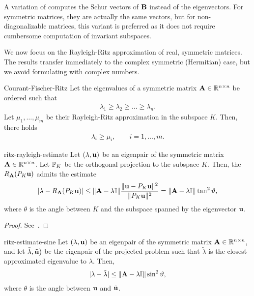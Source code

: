 \begin{remark}
  A variation of  computes the
  Schur vectors of $\matb$ instead of the eigenvectors. For symmetric
  matrices, they are actually the same vectors, but for
  non-diagonalizable matrices, this variant is preferred as it does
  not require cumbersome computation of invariant subspaces.
\end{remark}

\begin{intro}
  We now focus on the Rayleigh-Ritz approximation of real, symmetric
  matrices. The results transfer immediately to the complex symmetric
  (Hermitian) case, but we avoid formulating with complex numbers.
\end{intro}

\begin{Lemma}{Courant-Fischer-Ritz}
  Let the eigenvalues of a symmetric matrix $\mata\in\Rnn$ be ordered such that
  \begin{gather}
    \lambda_1\ge \lambda_2\ge \dots \ge \lambda_n.
  \end{gather}
  Let $\mu_1,\dots,\mu_m$ be their Rayleigh-Ritz approximation in the
  subspace $K$. Then, there holds
  \begin{gather}
    \lambda_i \ge \mu_i, \qquad i=1,\dots,m.
  \end{gather}
\end{Lemma}

\begin{Lemma}{ritz-rayleigh-estimate}
  Let $(\lambda,\vu)$ be an eigenpair of the symmetric matrix
  $\mata\in\Rnn$. Let $\P_K$ be the orthogonal projection to the
  subspace $K$. Then, the 
  $R_\mata(P_K \vu)$ admits the estimate
  \begin{gather}
    \abs*{\lambda-R_\mata(P_K \vu)}
    \le \norm{\mata-\lambda\id}
    \frac{\norm{\vu-P_K\vu}^2}{\norm{P_K\vu}^2}
    = \norm{\mata-\lambda\id} \tan^2\theta
    ,
  \end{gather}
  where $\theta$ is the angle between $K$ and the subspace spanned by the eigenvector $\vu$.
\end{Lemma}

\begin{proof}
  See~\cite[Lemma 4.1]{Saad11}.
\end{proof}

\begin{Lemma}{ritz-estimate-sine}
  Let $(\lambda,\vu)$ be an eigenpair of the symmetric matrix
  $\mata\in\Rnn$, and let $\tilde\lambda,\tilde\vu)$ be the eigenpair
  of the projected problem such that $\tilde\lambda$ is the closest
  approximated eigenvalue to $\lambda$.  Then,
  \begin{gather}
    \abs{\lambda-\tilde\lambda}
    \le \norm{\mata-\lambda\id} \sin^2\theta,
  \end{gather}
  where $\theta$ is the angle between $\vu$ and $\tilde\vu$.
\end{Lemma}

